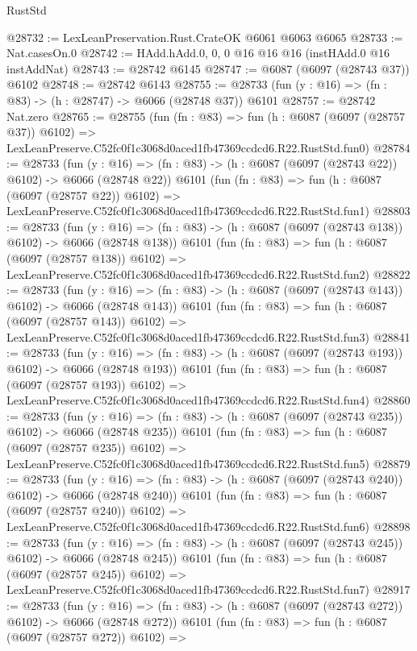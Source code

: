 \begin{lexlean}{RustStd}
\begin{coremodule}
@28732 := LexLeanPreservation.Rust.CrateOK @6061 @6063 @6065
@28733 := Nat.casesOn.{0}
@28742 := HAdd.hAdd.{0, 0, 0} @16 @16 @16 (instHAdd.{0} @16 instAddNat)
@28743 := @28742 @6145
@28747 := @6087 (@6097 (@28743 @37)) @6102
@28748 := @28742 @6143
@28755 := @28733 (fun (y : @16) => (fn : @83) -> (h : @28747) -> @6066 (@28748 @37)) @6101
@28757 := @28742 Nat.zero
@28765 := @28755
    (fun (fn : @83) =>
    fun (h : @6087 (@6097 (@28757 @37)) @6102) =>
    LexLeanPreserve.C52fc0f1c3068d0aced1fb47369ccdcd6.R22.RustStd.fun0)
@28784 := @28733
    (fun (y : @16) => (fn : @83) -> (h : @6087 (@6097 (@28743 @22)) @6102) -> @6066 (@28748 @22))
    @6101
    (fun (fn : @83) =>
    fun (h : @6087 (@6097 (@28757 @22)) @6102) =>
    LexLeanPreserve.C52fc0f1c3068d0aced1fb47369ccdcd6.R22.RustStd.fun1)
@28803 := @28733
    (fun (y : @16) => (fn : @83) -> (h : @6087 (@6097 (@28743 @138)) @6102) -> @6066 (@28748 @138))
    @6101
    (fun (fn : @83) =>
    fun (h : @6087 (@6097 (@28757 @138)) @6102) =>
    LexLeanPreserve.C52fc0f1c3068d0aced1fb47369ccdcd6.R22.RustStd.fun2)
@28822 := @28733
    (fun (y : @16) => (fn : @83) -> (h : @6087 (@6097 (@28743 @143)) @6102) -> @6066 (@28748 @143))
    @6101
    (fun (fn : @83) =>
    fun (h : @6087 (@6097 (@28757 @143)) @6102) =>
    LexLeanPreserve.C52fc0f1c3068d0aced1fb47369ccdcd6.R22.RustStd.fun3)
@28841 := @28733
    (fun (y : @16) => (fn : @83) -> (h : @6087 (@6097 (@28743 @193)) @6102) -> @6066 (@28748 @193))
    @6101
    (fun (fn : @83) =>
    fun (h : @6087 (@6097 (@28757 @193)) @6102) =>
    LexLeanPreserve.C52fc0f1c3068d0aced1fb47369ccdcd6.R22.RustStd.fun4)
@28860 := @28733
    (fun (y : @16) => (fn : @83) -> (h : @6087 (@6097 (@28743 @235)) @6102) -> @6066 (@28748 @235))
    @6101
    (fun (fn : @83) =>
    fun (h : @6087 (@6097 (@28757 @235)) @6102) =>
    LexLeanPreserve.C52fc0f1c3068d0aced1fb47369ccdcd6.R22.RustStd.fun5)
@28879 := @28733
    (fun (y : @16) => (fn : @83) -> (h : @6087 (@6097 (@28743 @240)) @6102) -> @6066 (@28748 @240))
    @6101
    (fun (fn : @83) =>
    fun (h : @6087 (@6097 (@28757 @240)) @6102) =>
    LexLeanPreserve.C52fc0f1c3068d0aced1fb47369ccdcd6.R22.RustStd.fun6)
@28898 := @28733
    (fun (y : @16) => (fn : @83) -> (h : @6087 (@6097 (@28743 @245)) @6102) -> @6066 (@28748 @245))
    @6101
    (fun (fn : @83) =>
    fun (h : @6087 (@6097 (@28757 @245)) @6102) =>
    LexLeanPreserve.C52fc0f1c3068d0aced1fb47369ccdcd6.R22.RustStd.fun7)
@28917 := @28733
    (fun (y : @16) => (fn : @83) -> (h : @6087 (@6097 (@28743 @272)) @6102) -> @6066 (@28748 @272))
    @6101
    (fun (fn : @83) =>
    fun (h : @6087 (@6097 (@28757 @272)) @6102) =>

\end{coremodule}
\end{lexlean}
